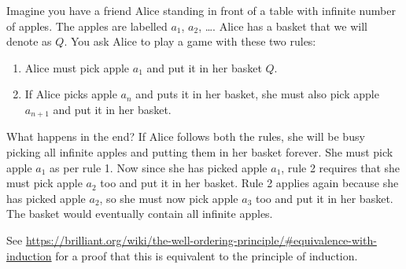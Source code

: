 \begin{notes}
Imagine you have a friend Alice standing in front of a table with
infinite number of apples. The apples are labelled \( a_1 \), \( a_2 \),
\dots. Alice has a basket that we will denote as \( Q \). You ask Alice
to play a game with these two rules:

\begin{enumerate}
  \item Alice must pick apple \( a_1 \) and put it in her basket \( Q \).
  \item If Alice picks apple \( a_n \) and puts it in her basket, she
    must also pick apple \( a_{n + 1} \) and put it in her basket.
\end{enumerate}

What happens in the end? If Alice follows both the rules, she will be
busy picking all infinite apples and putting them in her basket forever.
She must pick apple \( a_1 \) as per rule 1. Now since she has picked
apple \( a_1 \), rule 2 requires that she must pick apple \( a_2 \) too
and put it in her basket. Rule 2 applies again because she has picked
apple \( a_2 \), so she must now pick apple \( a_3 \) too and put it in
her basket. The basket would eventually contain all infinite apples.
\end{notes}

\begin{notes}
See
\url{https://brilliant.org/wiki/the-well-ordering-principle/#equivalence-with-induction}
for a proof that this is equivalent to the principle of induction.  
\end{notes}
